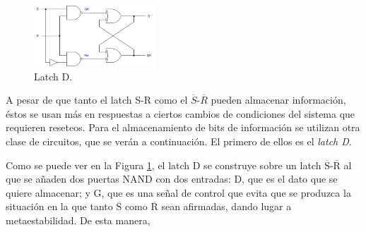 \begin{figure}
    \centering
    \includegraphics[width=0.4\textwidth]{figs/latch-d.drawio.png}
    \caption{Latch D.}
    \label{fig:latch-d}
\end{figure}

A pesar de que tanto el latch S-R como el $\overline{S}$-$\overline{R}$ pueden almacenar información, éstos se usan más en respuestas a ciertos cambios de condiciones del sistema que requieren reseteos. Para el almacenamiento de bits de información se utilizan otra clase de circuitos, que se verán a continuación. El primero de ellos es el \emph{latch D}.

Como se puede ver en la Figura \ref{fig:latch-d}, el latch D se construye sobre un latch $\overline{\text{S}}$-$\overline{\text{R}}$ al que se añaden dos puertas NAND con dos entradas: D, que es el dato que se quiere almacenar; y G, que es una señal de control que evita que se produzca la situación en la que tanto $\overline{\text{S}}$ como $\overline{\text{R}}$ sean afirmadas, dando lugar a metaestabilidad. De esta manera, 
